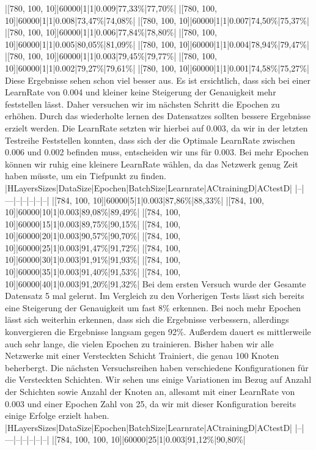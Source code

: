 \documentclass[12pt]{article}
\begin{document}
|[780, 100, 10]|60000|1|1|0.009|77,33\%|77,70\%|
|[780, 100, 10]|60000|1|1|0.008|73,47\%|74,08\%|
|[780, 100, 10]|60000|1|1|0.007|74,50\%|75,37\%|
|[780, 100, 10]|60000|1|1|0.006|77,84\%|78,80\%|
|[780, 100, 10]|60000|1|1|0.005|80,05\%|81,09\%|
|[780, 100, 10]|60000|1|1|0.004|78,94\%|79,47\%|
|[780, 100, 10]|60000|1|1|0.003|79,45\%|79,77\%|
|[780, 100, 10]|60000|1|1|0.002|79,27\%|79,61\%|
|[780, 100, 10]|60000|1|1|0.001|74,58\%|75,27\%|
	Diese Ergebnisse sehen schon viel besser aus. Es ist ersichtlich, dass sich bei einer LearnRate von 0.004 und kleiner keine Steigerung der Genauigkeit mehr feststellen lässt. Daher versuchen wir im nächsten Schritt die Epochen zu erhöhen. Durch das wiederholte lernen des Datensatzes sollten bessere Ergebnisse erzielt werden. Die LearnRate setzten wir hierbei auf 0.003, da wir in der letzten Testreihe Feststellen konnten, dass sich der die Optimale LearnRate zwischen 0.006 und 0.002 befinden muss, entscheiden wir uns für 0.003. Bei mehr Epochen können wir ruhig eine kleinere LearnRate wählen, da das Netzwerk genug Zeit haben müsste, um ein Tiefpunkt zu finden.
|HLayersSizes|DataSize|Epochen|BatchSize|Learnrate|ACtrainingD|ACtestD|
|--|---|--|--|--|--|--|
|[784, 100, 10]|60000|5|1|0.003|87,86\%|88,33\%|
|[784, 100, 10]|60000|10|1|0.003|89,08\%|89,49\%|
|[784, 100, 10]|60000|15|1|0.003|89,75\%|90,15\%|
|[784, 100, 10]|60000|20|1|0.003|90,57\%|90,70\%|
|[784, 100, 10]|60000|25|1|0.003|91,47\%|91,72\%|
|[784, 100, 10]|60000|30|1|0.003|91,91\%|91,93\%|
|[784, 100, 10]|60000|35|1|0.003|91,40\%|91,53\%|
|[784, 100, 10]|60000|40|1|0.003|91,20\%|91,32\%|
Bei dem ersten Versuch wurde der Gesamte Datensatz 5 mal gelernt. Im Vergleich zu den Vorherigen Tests lässt sich bereits eine Steigerung der Genauigkeit um fast 8\% erkennen. Bei noch mehr Epochen lässt sich weiterhin erkennen, dass sich die Ergebnisse verbessern, allerdings konvergieren die Ergebnisse langsam gegen 92\%. Außerdem dauert es mittlerweile auch sehr lange, die vielen Epochen zu trainieren. Bisher haben wir alle Netzwerke mit einer Versteckten Schicht Trainiert, die genau 100 Knoten beherbergt. Die nächsten Versuchsreihen haben verschiedene Konfigurationen für die Versteckten Schichten. Wir sehen uns einige Variationen im Bezug auf Anzahl der Schichten sowie Anzahl der Knoten an, allesamt mit einer LearnRate von 0.003 und einer Epochen Zahl von 25, da wir mit dieser Konfiguration bereits einige Erfolge erzielt haben. 
|HLayersSizes|DataSize|Epochen|BatchSize|Learnrate|ACtrainingD|ACtestD|
|--|---|--|--|--|--|--|
|[784, 100, 100, 10]|60000|25|1|0.003|91,12\%|90,80\%|
\end{document}
